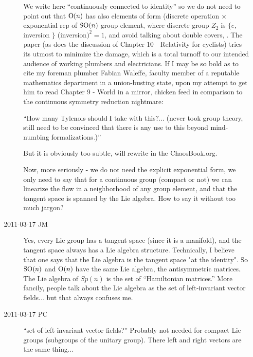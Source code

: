\begin{description}
We write here
``continuously connected to identity'' so we do not need to point out
that $\textrm{O}(n)$ has also elements of form (discrete operation $\times$
exponential rep of $\textrm{SO}(n)$ group element, where discrete group $Z_2$ is
$\{e,$inversion $\}$ (inversion$)^2=1$, and avoid talking about double
covers, \etc. The paper (as does the discussion of
{Chapter 10 - Relativity for cyclists}) tries its utmost to minimize the
damage, which is a total turnoff to our intended audience of working
plumbers and electricians. If I may be so bold as to cite my foreman
plumber Fabian Waleffe, faculty member of a reputable mathematics
department in a union-busting state, upon my attempt to get him to read
{Chapter 9 - World in a mirror}, chicken feed in comparison to the
continuous symmetry reduction nightmare:

``How many Tylenols should I take with this?... (never took group theory,
still need to be convinced that there is any use to this beyond
mind-numbing formalizations.)''

But it is obviously too subtle, will rewrite in the ChaosBook.org.

Now, more seriously - we do not need the explicit exponential form, we
only need to say that for a continuous group (compact or not) we can
linearize the flow in a neighborhood of any group element, and that
the tangent space is spanned by the Lie algebra. How to say it without
too much jargon?

\item[2011-03-17 JM]
Yes, every Lie group has a tangent space (since it is a manifold), and
the tangent space always has a Lie algebra structure. Technically, I
believe that one says that the Lie algebra is the tangent space "at the
identity". So $\textrm{SO}(n)$ and $\textrm{O}(n)$ have the same Lie algebra, the
antisymmetric matrices. The Lie algebra of $Sp(n)$ is the set of
``Hamiltonian matrices.'' More fancily, people talk about the Lie algebra
as the set of left-invariant vector fields... but that always confuses
me.

\item[2011-03-17 PC]
``set of left-invariant vector fields?'' Probably not needed
for compact Lie groups (subgroups of the unitary group). There left
and right vectors are the same thing...


\end{description}
